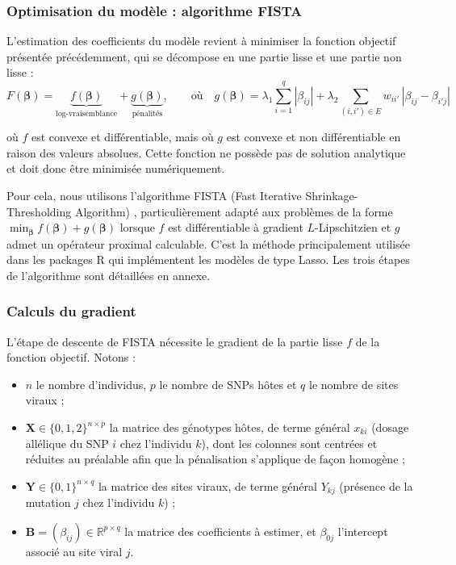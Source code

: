 \documentclass[11pt,a4paper]{article}
\begin{document}
\subsubsection{Optimisation du modèle : algorithme FISTA}

L'estimation des coefficients du modèle revient à minimiser la fonction
objectif présentée précédemment, qui se décompose en une partie lisse et une
partie non lisse :
\[
F(\boldsymbol{\beta}) = \underbrace{f(\boldsymbol{\beta})}_{\text{log-vraisemblance}}
+ \underbrace{g(\boldsymbol{\beta})}_{\text{pénalités}}, \qquad \text{où} \quad
g(\boldsymbol{\beta}) = \lambda_1 \sum_{i=1}^{q} |\beta_{ij}|
+ \lambda_2 \sum_{(i,i') \in E} w_{ii'} \, |\beta_{ij} - \beta_{i'j}|
\]

où $f$ est convexe et différentiable, mais où $g$ est convexe et non
différentiable en raison des valeurs absolues. Cette fonction ne possède pas
de solution analytique et doit donc être minimisée numériquement.

Pour cela, nous utilisons l'algorithme FISTA (Fast Iterative
Shrinkage-Thresholding Algorithm) \cite{FISTA}, particulièrement adapté aux
problèmes de la forme $\min_{\boldsymbol\beta} f(\boldsymbol\beta) +
g(\boldsymbol\beta)$ lorsque $f$ est différentiable à gradient
$L$-Lipschitzien et $g$ admet un opérateur proximal calculable. C'est la
méthode principalement utilisée dans les packages R qui implémentent les
modèles de type Lasso. Les trois étapes de l'algorithme sont détaillées en annexe.



\subsubsection{Calculs du gradient}

L'étape de descente de FISTA nécessite le gradient de la partie lisse $f$ de
la fonction objectif. Notons :
\begin{itemize}
    \item $n$ le nombre d'individus, $p$ le nombre de SNPs hôtes et $q$ le
          nombre de sites viraux ;
    \item $\mathbf{X} \in \{0,1,2\}^{n \times p}$ la matrice des génotypes
          hôtes, de terme général $x_{ki}$ (dosage allélique du SNP $i$ chez
          l'individu $k$), dont les colonnes sont centrées et réduites au
          préalable afin que la pénalisation s'applique de façon homogène ;
    \item $\mathbf{Y} \in \{0,1\}^{n \times q}$ la matrice des sites viraux,
          de terme général $Y_{kj}$ (présence de la mutation $j$ chez
          l'individu $k$) ;
    \item $\mathbf{B} = (\beta_{ij}) \in \mathbb{R}^{p \times q}$ la matrice
          des coefficients à estimer, et $\beta_{0j}$ l'intercept associé au
          site viral $j$.
\end{itemize}
\end{document}
